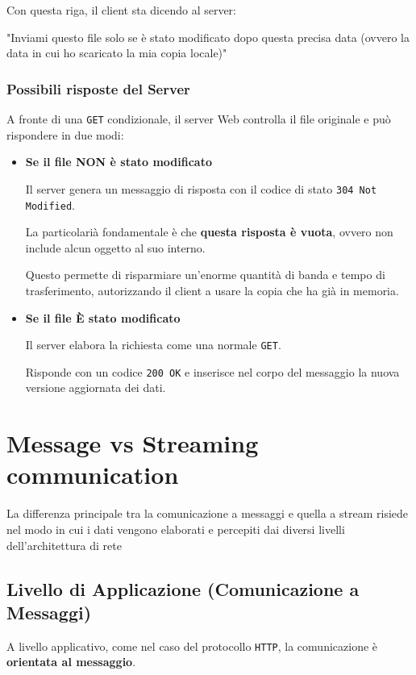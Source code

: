 Con questa riga, il client sta dicendo al server: 

"Inviami questo file solo se è stato modificato dopo questa precisa data (ovvero la data in cui ho scaricato la mia copia locale)"

\subsubsection{Possibili risposte del Server}
A fronte di una \texttt{GET} condizionale, il server Web controlla il file originale e può rispondere in due modi:

\begin{itemize}
    \item \textbf{Se il file NON è stato modificato}
    
    Il server genera un messaggio di risposta con il codice di stato \texttt{304 Not Modified}.

    La particolarià fondamentale è che \textbf{questa risposta è vuota}, ovvero non include alcun oggetto al suo interno.

    Questo permette di risparmiare un'enorme quantità di banda e tempo di trasferimento, autorizzando il client a usare la copia che ha già in memoria.

    \item  \textbf{Se il file È stato modificato}
    
    Il server elabora la richiesta come una normale \texttt{GET}.

    Risponde con un codice \texttt{200 OK} e inserisce nel corpo del messaggio la nuova versione aggiornata dei dati.
\end{itemize}

\newpage

\section{Message vs Streaming communication}
La differenza principale tra la comunicazione a messaggi e quella a stream risiede nel modo in cui i dati vengono elaborati e percepiti dai diversi livelli dell'architettura di rete

\subsection{Livello di Applicazione (Comunicazione a Messaggi)}
A livello applicativo, come nel caso del protocollo \texttt{HTTP}, la comunicazione è \textbf{orientata al messaggio}.

